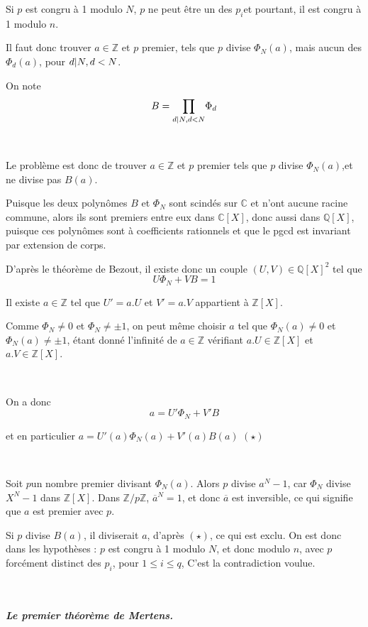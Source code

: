 Si $p$ est congru {\`a} 1 modulo $N$, $p$ ne peut {\^e}tre un des $p_i $et
pourtant, il est congru {\`a} 1 modulo $n$.

Il faut donc trouver $a \in \mathbb{Z}$ et $p$ premier, tels que $p$ divise
$\Phi_N (a)$, mais aucun des $\Phi_d (a)$, pour $d | N , d < N$.

On note
\[ B = \underset{d | N , d < N}{\prod} \Phi_d \]


\

Le probl{\`e}me est donc de trouver $a \in \mathbb{Z}$ et $p$ premier tels
que $p$ divise $\Phi_N (a)$,et ne divise pas $B (a)$.

Puisque les deux polyn{\^o}mes $B$ et $\Phi_N$ sont scind{\'e}s sur
$\mathbb{C}$ et n'ont aucune racine commune, alors ils sont premiers entre eux
dans $\mathbb{C} [X]$, donc aussi dans $\mathbb{Q} [X]$, puisque ces
polyn{\^o}mes sont {\`a} coefficients rationnels et que le pgcd est invariant
par extension de corps.

D'apr{\`e}s le th{\'e}or{\`e}me de Bezout, il existe donc un couple $(U, V)
\in \mathbb{Q} [X]^2$ tel que
\[ U \Phi_N + V B = 1 \]


Il existe $a \in \mathbb{Z}$ tel que $U' = a.U$ et $V' = a.V$ appartient {\`a}
$\mathbb{Z} [X]$.

Comme $\Phi_N \neq 0$ et $\Phi_N \neq \pm 1$, on peut m{\^e}me choisir $a$ tel
que $\Phi_N (a) \neq 0$ et $\Phi_N (a) \neq \pm 1$, {\'e}tant donn{\'e}
l'infinit{\'e} de $a \in \mathbb{Z}$ v{\'e}rifiant $a.U \in \mathbb{Z} [X]$ et
$a.V \in \mathbb{Z} [X]$.

\

On a donc
\[ a = U' \Phi_N + V' B \]


et en particulier $a = U' (a) \Phi_N (a) + V' (a) B (a)$ $(\star)$

\

Soit $p$un nombre premier divisant $\Phi_N (a)$. Alors $p$ divise $a^N - 1$,
car $\Phi_N$ divise $X^N - 1$ dans $\mathbb{Z} [X]$. Dans $\mathbb{Z}/
p\mathbb{Z}$, $\overline{a}^N = 1$, et donc $\overline{a}$ est inversible, ce
qui signifie que $a$ est premier avec $p$.

Si $p$ divise $B (a)$, il diviserait $a$, d'apr{\`e}s $(\star)$, ce qui est
exclu. On est donc dans les hypoth{\`e}ses : $p$ est congru {\`a} 1 modulo
$N$, et donc modulo $n$, avec $p$ forc{\'e}ment distinct des $p_i$, pour $1
\leqslant i \leqslant q$, C'est la contradiction voulue.

\

\subparagraph{Le premier th{\'e}or{\`e}me de Mertens.}

